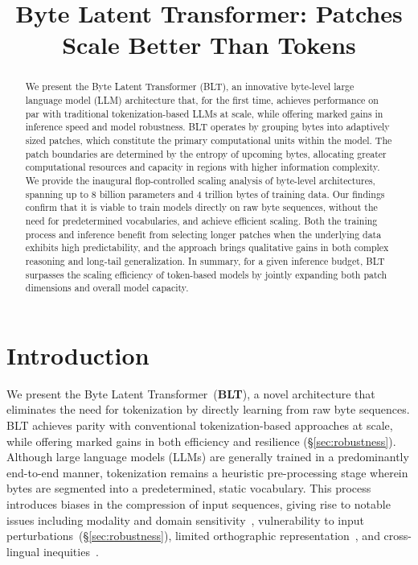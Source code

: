 \title{Byte Latent Transformer: Patches Scale Better Than Tokens}

\begin{abstract}
We present the Byte Latent Transformer (\textsc{BLT}), an innovative byte-level large language model (LLM) architecture that, for the first time, achieves performance on par with traditional tokenization-based LLMs at scale, while offering marked gains in inference speed and model robustness. \textsc{BLT} operates by grouping bytes into adaptively sized patches, which constitute the primary computational units within the model. The patch boundaries are determined by the entropy of upcoming bytes, allocating greater computational resources and capacity in regions with higher information complexity. We provide the inaugural flop-controlled scaling analysis of byte-level architectures, spanning up to 8 billion parameters and 4 trillion bytes of training data. Our findings confirm that it is viable to train models directly on raw byte sequences, without the need for predetermined vocabularies, and achieve efficient scaling. Both the training process and inference benefit from selecting longer patches when the underlying data exhibits high predictability, and the approach brings qualitative gains in both complex reasoning and long-tail generalization. In summary, for a given inference budget, \textsc{BLT} surpasses the scaling efficiency of token-based models by jointly expanding both patch dimensions and overall model capacity.
\end{abstract}

\section{Introduction}
\label{section:intro}

We present the Byte Latent Transformer~(\textbf{BLT}), a novel architecture that eliminates the need for tokenization by directly learning from raw byte sequences. BLT achieves parity with conventional tokenization-based approaches at scale, while offering marked gains in both efficiency and resilience (\S\ref{sec:robustness}).
Although large language models (LLMs) are generally trained in a predominantly end-to-end manner, tokenization remains a heuristic pre-processing stage wherein bytes are segmented into a predetermined, static vocabulary. This process introduces biases in the compression of input sequences, giving rise to notable issues including modality and domain sensitivity~\citep{dagangetting}, vulnerability to input perturbations~(\S\ref{sec:robustness}), limited orthographic representation~\citep{edman2024cute}, and cross-lingual inequities~\citep{liang2023xlm,petrov2024language,limisiewicz2024myte}.

